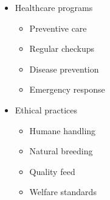 \begin{itemize}
\begin{itemize}
        \item Healthcare programs
        \begin{itemize}
            \item Preventive care
            \item Regular checkups
            \item Disease prevention
            \item Emergency response
        \end{itemize}
        
        \item Ethical practices
        \begin{itemize}
            \item Humane handling
            \item Natural breeding
            \item Quality feed
            \item Welfare standards
        \end{itemize}
    \end{itemize}
\end{itemize}

